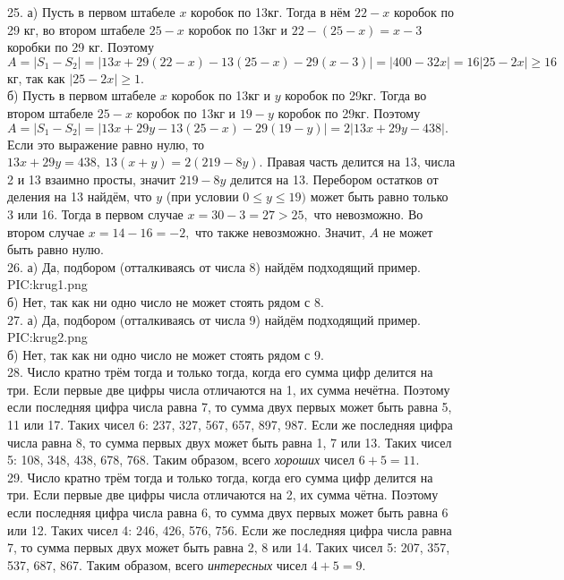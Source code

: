 25. а) Пусть в первом штабеле $x$ коробок по 13кг. Тогда в нём $22-x$ коробок по 29 кг, во втором штабеле $25-x$ коробок по 13кг и $22-(25-x)=x-3$ коробки по 29 кг.
Поэтому $A=|S_1-S_2|=|13x+29(22-x)-13(25-x)-29(x-3)|=|400-32x|=16|25-2x|\geqslant16$кг, так как $|25-2x|\geqslant1.$\\
б) Пусть в первом штабеле $x$ коробок по 13кг и $y$ коробок по 29кг. Тогда во втором штабеле $25-x$ коробок по 13кг и $19-y$ коробок по 29кг. Поэтому
$A=|S_1-S_2|=|13x+29y-13(25-x)-29(19-y)|=2|13x+29y-438|.$ Если это выражение равно нулю, то $13x+29y=438,\ 13(x+y)=2(219-8y).$ Правая часть делится на 13, числа 2 и 13 взаимно просты, значит $219-8y$ делится на 13. Перебором остатков от деления на 13 найдём, что $y$ (при условии $0\leqslant y\leqslant19)$ может быть равно только 3 или 16. Тогда в первом случае $x=30-3=27>25,$ что невозможно. Во втором случае $x=14-16=-2,$ что также невозможно. Значит, $A$ не может быть равно нулю.\\
26. а) Да, подбором (отталкиваясь от числа 8) найдём подходящий пример.
{{PIC:krug1.png}}\\
б) Нет, так как ни одно число не может стоять рядом с 8.\\
27. а) Да, подбором (отталкиваясь от числа 9) найдём подходящий пример.
{{PIC:krug2.png}}\\
б) Нет, так как ни одно число не может стоять рядом с 9.\\
28. Число кратно трём тогда и только тогда, когда его сумма цифр делится на три. Если первые две цифры числа отличаются на 1, их сумма нечётна. Поэтому если последняя цифра числа равна 7, то сумма двух первых может быть равна 5, 11 или 17. Таких чисел 6: 237, 327, 567, 657, 897, 987. Если же последняя цифра числа равна 8, то сумма первых двух может быть равна 1, 7 или 13. Таких чисел 5: 108, 348, 438, 678, 768. Таким образом, всего {\it хороших} чисел $6+5=11.$\\
29. Число кратно трём тогда и только тогда, когда его сумма цифр делится на три. Если первые две цифры числа отличаются на 2, их сумма чётна. Поэтому если последняя цифра числа равна 6, то сумма двух первых может быть равна 6 или 12. Таких чисел 4: 246, 426, 576, 756. Если же последняя цифра числа равна 7, то сумма первых двух может быть равна 2, 8 или 14. Таких чисел 5: 207, 357, 537, 687, 867. Таким образом, всего {\it интересных} чисел $4+5=9.$\\
